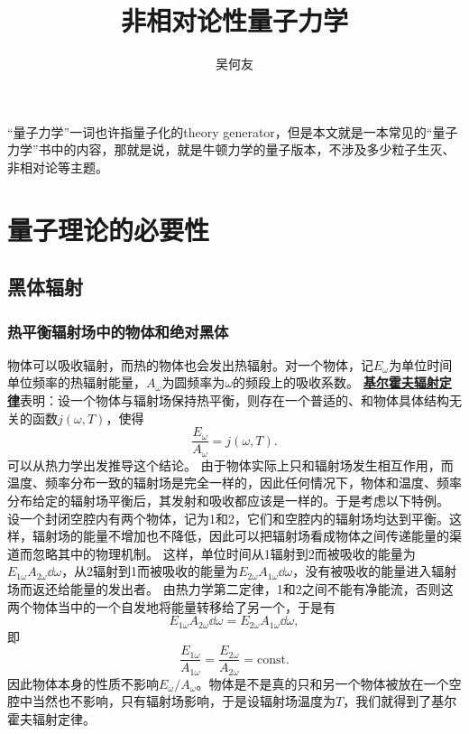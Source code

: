 \documentclass[UTF8, a4paper]{ctexart}
\title{非相对论性量子力学}
\author{吴何友}
\newcommand*{\const}{\mathrm{const}}
\newcommand{\concept}[1]{\underline{\textbf{#1}}}
\begin{document}
\maketitle

“量子力学”一词也许指量子化的theory generator，但是本文就是一本常见的“量子力学”书中的内容，那就是说，就是牛顿力学的量子版本，不涉及多少粒子生灭、非相对论等主题。

\section{量子理论的必要性}

\subsection{黑体辐射}

\subsubsection{热平衡辐射场中的物体和绝对黑体}

物体可以吸收辐射，而热的物体也会发出热辐射。对一个物体，记$E_\omega$为单位时间单位频率的热辐射能量，$A_\omega$为圆频率为$\omega$的频段上的吸收系数。
\concept{基尔霍夫辐射定律}表明：设一个物体与辐射场保持热平衡，则存在一个普适的、和物体具体结构无关的函数$j(\omega, T)$，使得
\begin{equation}
    \frac{E_\omega}{A_\omega} = j(\omega, T).
\end{equation}
可以从热力学出发推导这个结论。
由于物体实际上只和辐射场发生相互作用，而温度、频率分布一致的辐射场是完全一样的，因此任何情况下，物体和温度、频率分布给定的辐射场平衡后，其发射和吸收都应该是一样的。于是考虑以下特例。
设一个封闭空腔内有两个物体，记为1和2，它们和空腔内的辐射场均达到平衡。这样，辐射场的能量不增加也不降低，因此可以把辐射场看成物体之间传递能量的渠道而忽略其中的物理机制。
这样，单位时间从1辐射到2而被吸收的能量为$E_{1\omega} A_{2\omega} \dd{\omega}$，从2辐射到1而被吸收的能量为$E_{2\omega} A_{1\omega} \dd{\omega}$，没有被吸收的能量进入辐射场而返还给能量的发出者。
由热力学第二定律，1和2之间不能有净能流，否则这两个物体当中的一个自发地将能量转移给了另一个，于是有
\[
    E_{1\omega} A_{2\omega} \dd{\omega} = E_{2\omega} A_{1\omega} \dd{\omega},
\]
即
\[
    \frac{E_{1\omega}}{A_{1\omega}} = \frac{E_{2\omega}}{A_{2\omega}} = \const.
\]
因此物体本身的性质不影响$E_\omega / A_\omega$。物体是不是真的只和另一个物体被放在一个空腔中当然也不影响，只有辐射场影响，于是设辐射场温度为$T$，我们就得到了基尔霍夫辐射定律。
\end{document}
